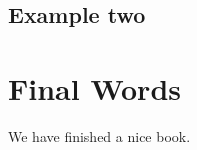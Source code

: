 \documentclass[]{book}
\begin{document}
\hypertarget{example-two}{%
\section{Example two}\label{example-two}}

\hypertarget{final-words}{%
\chapter{Final Words}\label{final-words}}

We have finished a nice book.


\end{document}
